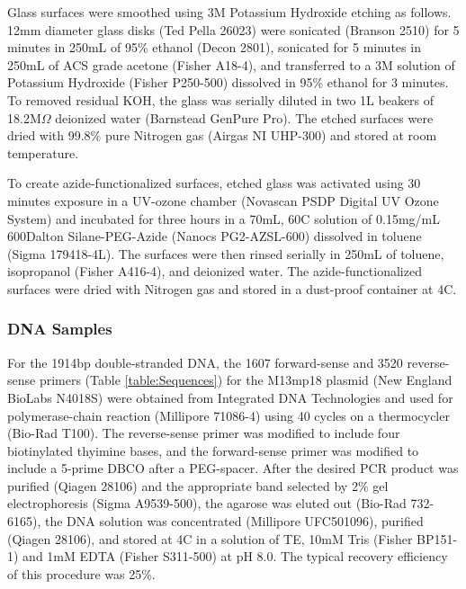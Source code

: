 \documentclass[%
  aip,12pt,tightenlines,
  amsthm,
 amsmath,amssymb
]{article}
\newcommand{\tRef}[1]{Table \ref{table:#1}}
\newcommand{\sLabel}[1]{\label{section:#1}}
\newcommand{\firstp}[0]{}
\newcommand{\pl}[0]{\vspace{6pt}}
\newcommand{\supply}[2]{(#1 #2)}
\newcommand{\degreeC}[0]{\degree{}C}
\begin{document}
\firstp Glass surfaces were smoothed using 3M Potassium Hydroxide etching as follows. 12mm diameter glass disks \supply{Ted Pella}{26023} were sonicated \supply{Branson}{2510} for 5 minutes in 250mL of 95\% ethanol \supply{Decon}{2801}, sonicated  for 5 minutes in 250mL of ACS grade acetone \supply{Fisher}{A18-4}, and transferred to a 3M solution of Potassium Hydroxide \supply{Fisher}{P250-500} dissolved in 95\% ethanol for 3 minutes. To removed residual KOH, the glass was serially diluted in two 1L beakers of 18.2M$\Omega$ deionized water \supply{Barnstead}{GenPure Pro}. The etched surfaces were dried with 99.8\% pure Nitrogen gas \supply{Airgas}{NI UHP-300} and stored at room temperature. \pl

To create azide-functionalized surfaces, etched glass was activated using 30 minutes exposure in a UV-ozone chamber \supply{Novascan}{PSDP Digital UV Ozone System} and incubated for three hours in a 70mL, 60\degreeC{} solution of 0.15mg/mL 600Dalton Silane-PEG-Azide \supply{Nanocs}{PG2-AZSL-600} dissolved in toluene \supply{Sigma}{179418-4L}. The surfaces were then rinsed serially in 250mL of toluene, isopropanol \supply{Fisher}{A416-4}, and deionized water. The azide-functionalized surfaces were dried with Nitrogen gas and stored in a dust-proof container at 4\degreeC{}. \pl 

\subsubsection{\sLabel{Sample}DNA Samples}

\firstp For the 1914bp double-stranded DNA, the 1607 forward-sense and 3520 reverse-sense primers (\tRef{Sequences}) for the M13mp18 plasmid \supply{New England BioLabs}{N4018S} were obtained from Integrated DNA Technologies  and used for polymerase-chain reaction \supply{Millipore}{71086-4} using 40 cycles on a thermocycler \supply{Bio-Rad}{T100}. The reverse-sense primer was modified to include four biotinylated thyimine bases, and the forward-sense primer was modified to include a 5-prime DBCO after a PEG-spacer. After the desired PCR product was purified \supply{Qiagen}{28106} and the appropriate band selected by 2\% gel electrophoresis \supply{Sigma}{A9539-500}, the agarose was eluted out \supply{Bio-Rad}{732-6165}, the DNA solution was concentrated \supply{Millipore}{UFC501096}, purified \supply{Qiagen}{28106}, and stored at 4\degreeC{} in a solution of TE, 10mM Tris \supply{Fisher}{BP151-1} and 1mM EDTA \supply{Fisher}{S311-500} at pH 8.0. The typical recovery efficiency of this procedure was 25\%. \pl 
\end{document}
